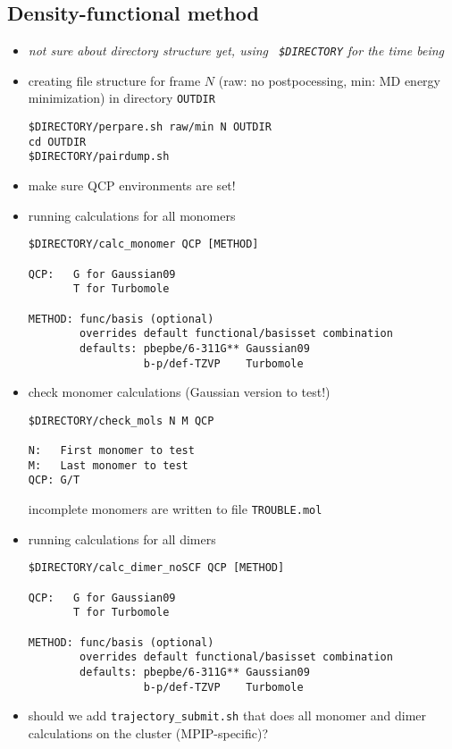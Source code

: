 \subsection{Density-functional method}
\label{sec:dft}

\begin{itemize}
\item {\it not sure about directory structure yet, using {\tt
      \$DIRECTORY} for the time being}
\item creating file structure for frame $N$ (raw: no postpocessing,
  min: MD energy minimization) in directory {\tt OUTDIR}
\begin{verbatim}
$DIRECTORY/perpare.sh raw/min N OUTDIR
cd OUTDIR
$DIRECTORY/pairdump.sh
\end{verbatim}
\item make sure QCP environments are set!
\item running calculations for all monomers
 \begin{verbatim}
$DIRECTORY/calc_monomer QCP [METHOD]

QCP:   G for Gaussian09
       T for Turbomole

METHOD: func/basis (optional)
        overrides default functional/basisset combination
        defaults: pbepbe/6-311G** Gaussian09
                  b-p/def-TZVP    Turbomole
\end{verbatim}
\item check monomer calculations (Gaussian version to test!) 
\begin{verbatim}
$DIRECTORY/check_mols N M QCP

N:   First monomer to test
M:   Last monomer to test
QCP: G/T 
\end{verbatim}
incomplete monomers are written to file {\tt TROUBLE.mol}
\item running calculations for all dimers
 \begin{verbatim}
$DIRECTORY/calc_dimer_noSCF QCP [METHOD]

QCP:   G for Gaussian09
       T for Turbomole

METHOD: func/basis (optional)
        overrides default functional/basisset combination
        defaults: pbepbe/6-311G** Gaussian09
                  b-p/def-TZVP    Turbomole
\end{verbatim}
\item should we add {\tt trajectory\_submit.sh} that does all monomer
  and dimer calculations on the cluster (MPIP-specific)?
\end{itemize}
